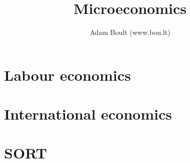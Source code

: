 \documentclass[oneside]{book}
\begin{document}
\author{Adam Boult (www.bou.lt)}
\title{Microeconomics}
\maketitle

\setcounter{tocdepth}{0}
\tableofcontents



\part{Labour economics}



\part{International economics}



\part{SORT}



\end{document}

